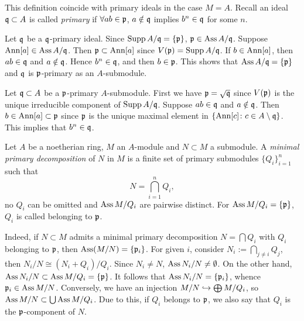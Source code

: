         \begin{remark}\label{rem: primary submodule and primary ideal}
            This definition coincide with primary ideals in the case $M = A$.
            Recall an ideal ${\mathfrak{q}} \subset A$ is called \textit{primary} if $\forall ab \in {\mathfrak{p}}$, 
            $a \notin {\mathfrak{q}}$ implies $b^n \in {\mathfrak{q}}$ for some $n$. 
            
            Let ${\mathfrak{q}}$ be a ${\mathfrak{q}}$-primary ideal.
            Since $\operatorname{Supp} A/{\mathfrak{q}} = \{{\mathfrak{p}}\}$, ${\mathfrak{p}} \in \operatorname{Ass} A/{\mathfrak{q}}$.
            Suppose $\operatorname{Ann} [a] \in \operatorname{Ass} A/{\mathfrak{q}}$.
            Then ${\mathfrak{p}} \subset \operatorname{Ann} [a]$ since $V({\mathfrak{p}}) = \operatorname{Supp} A/{\mathfrak{q}}$.
            If $b \in \operatorname{Ann} [a]$, then $ab \in {\mathfrak{q}}$ and $a\notin {\mathfrak{q}}$.
            Hence $b^n \in {\mathfrak{q}}$, and then $b \in {\mathfrak{p}}$.
            This shows that $\operatorname{Ass} A/{\mathfrak{q}} = \{{\mathfrak{p}}\}$ and ${\mathfrak{q}}$ is ${\mathfrak{p}}$-primary as an $A$-submodule. 

            Let ${\mathfrak{q}} \subset A$ be a ${\mathfrak{p}}$-primary $A$-submodule.
            First we have ${\mathfrak{p}} = \sqrt{{\mathfrak{q}}}$ since $V({\mathfrak{p}})$ is the unique irreducible component of $\operatorname{Supp} A/{\mathfrak{q}}$.
            Suppose $ab \in {\mathfrak{q}}$ and $a\notin {\mathfrak{q}}$.
            Then $b \in \operatorname{Ann} [a] \subset {\mathfrak{p}}$ since ${\mathfrak{p}}$ is the unique maximal element in $\{ \operatorname{Ann} [c] \colon c \in A \setminus {\mathfrak{q}}\}$.
            This implies that $b^n \in {\mathfrak{q}}$.
        \end{remark}

        \begin{definition}\label{def: minimal primary decomposition}
            Let $A$ be a noetherian ring, $M$ an $A$-module and $N \subset M$ a submodule.
            A \textit{minimal primary decomposition} of $N$ in $M$ is a finite set of primary submodules $\{Q_i\}_{i=1}^n$ such that 
            \[ N = \bigcap_{i=1}^n Q_i, \] 
            no $Q_i$ can be omitted and $\operatorname{Ass} M/Q_i$ are pairwise distinct.
            For $\operatorname{Ass} M/Q_i = \{{\mathfrak{p}}\}$, $Q_i$ is called belonging to ${\mathfrak{p}}$.
        \end{definition}

        Indeed, if $N \subset M$ admits a minimal primary decomposition $N = \bigcap Q_i$ with $Q_i$ belonging to ${\mathfrak{p}}$,
        then $\operatorname{Ass}(M/N) = \{{\mathfrak{p}}_i\}$.
        For given $i$, consider $N_i := \bigcap_{j\neq i} Q_j$, then $N_i/N \cong (N_i+Q_i)/Q_i$.
        Since $N_i \neq N$, $\operatorname{Ass} N_i/N \neq \emptyset$.
        On the other hand, $\operatorname{Ass} N_i/N \subset \operatorname{Ass} M/Q_i = \{{\mathfrak{p}}\}$.
        It follows that $\operatorname{Ass} N_i/N = \{{\mathfrak{p}}_i\}$, whence ${\mathfrak{p}}_i \in \operatorname{Ass} M/N$.
        Conversely, we have an injection $M/N \hookrightarrow \bigoplus M/Q_i$, so $\operatorname{Ass} M/N \subset \bigcup \operatorname{Ass} M/Q_i$.
        Due to this, if $Q_i$ belongs to ${\mathfrak{p}}$, we also say that $Q_i$ is the ${\mathfrak{p}}$-component of $N$.
    
